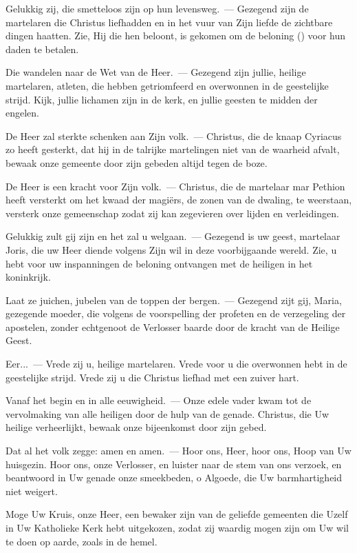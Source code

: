 \documentclass[12pt,twoside,a5paper]{article}
\begin{document}
\begin{halfparskip}
  Gelukkig zij, die smetteloos zijn op hun levensweg.~--- Gezegend zijn de martelaren die Christus liefhadden en in het vuur van Zijn liefde de zichtbare dingen haatten. Zie, Hij die hen beloont, is gekomen om de beloning () voor hun daden te betalen.

  Die wandelen naar de Wet van de Heer.~--- Gezegend zijn jullie, heilige martelaren, atleten, die hebben getriomfeerd en overwonnen in de geestelijke strijd. Kijk, jullie lichamen zijn in de kerk, en jullie geesten te midden der engelen.

  De Heer zal sterkte schenken aan Zijn volk.~--- Christus, die de knaap Cyriacus zo heeft gesterkt, dat hij in de talrijke martelingen niet van de waarheid afvalt, bewaak onze gemeente door zijn gebeden altijd tegen de boze.

  De Heer is een kracht voor Zijn volk.~--- Christus, die de martelaar mar Pethion heeft versterkt om het kwaad der magiërs, de zonen van de dwaling, te weerstaan, versterk onze gemeenschap zodat zij kan zegevieren over lijden en verleidingen.

  Gelukkig zult gij zijn en het zal u welgaan.~--- Gezegend is uw geest, martelaar Joris, die uw Heer diende volgens Zijn wil in deze voorbijgaande wereld. Zie, u hebt voor uw inspanningen de beloning ontvangen met de heiligen in het koninkrijk.

  Laat ze juichen, jubelen van de toppen der bergen.~--- Gezegend zijt gij, Maria, gezegende moeder, die volgens de voorspelling der profeten en de verzegeling der apostelen, zonder echtgenoot de Verlosser baarde door de kracht van de Heilige Geest.

  Eer...~--- Vrede zij u, heilige martelaren. Vrede voor u die overwonnen hebt in de geestelijke strijd. Vrede zij u die Christus liefhad met een zuiver hart.

  Vanaf het begin en in alle eeuwigheid.~--- Onze edele vader kwam tot de vervolmaking van alle heiligen door de hulp van de genade. Christus, die Uw heilige verheerlijkt, bewaak onze bijeenkomst door zijn gebed.

  Dat al het volk zegge: amen en amen.~--- Hoor ons, Heer, hoor ons, Hoop van Uw huisgezin. Hoor ons, onze Verlosser, en luister naar de stem van ons verzoek, en beantwoord in Uw genade onze smeekbeden, o Algoede, die Uw barmhartigheid niet weigert.

  Moge Uw Kruis, onze Heer, een bewaker zijn van de geliefde gemeenten die Uzelf in Uw Katholieke Kerk hebt uitgekozen, zodat zij waardig mogen zijn om Uw wil te doen op aarde, zoals in de hemel.


\end{halfparskip}
\end{document}
